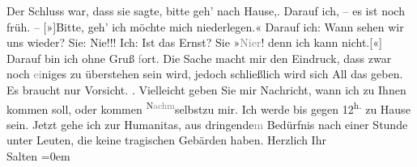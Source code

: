 \begin{ledgroupsized}[t]{13cm}
           \pstart
           Der Schluss war, dass sie
               sagte, bitte geh’ nach Hause,. Darauf ich, – es ist noch früh. –
                  {[}»{]}Bitte, geh’ ich möchte mich niederlegen.« Darauf ich: Wann
               sehen wir uns wieder? Sie:
               Nie!!! Ich: Ist das Ernst? Sie »\textcolor{gray}{Ni{\geminationm}er}! {\pb}denn ich kann
                  nicht.{[}«{]} Darauf bin ich ohne Gruß \textcolor{gray}{f}ort.\pend
           \pstart
           Die Sache macht mir den Eindruck, dass zwar noch \textcolor{gray}{ei}niges zu
               überstehen sein wird, jedoch schließlich wird sich All das geben. Es braucht nur
               Vorsicht.\pend
           \pstart
           \label{K_L03149-2v}\label{K_L03149-2h}. Vielleicht geben Sie mir Nachricht, wann ich zu Ihnen kommen soll, oder
               kommen \substVorne{}\textsuperscript{N\textcolor{gray}{achm}}\substDazwischen{}selbst\substHinten{}{ }{\pb}zu mir. Ich werde bis gegen
                     12\textsuperscript{h.}{ }zu Hause sein.\pend
           \pstart
           Jetzt gehe ich zur Humanitas, aus
                  dringende\textcolor{gray}{m} Bedürfnis nach einer Stunde unter Leuten, die keine
               tragischen Gebärden haben.\pend
           \pstart
           Herzlich Ihr {\\[\baselineskip]}\spacefill\mbox{Salten}\pend
           \leftskip=0em{}
         
         \endnumbering{}\end{ledgroupsized}  \newcommand{\dateiname}{L03149}\newcommand{\titel}{Felix Salten an Arthur Schnitzler, [26. 1. 1895]}\newcommand{\editorInnen}{Martin Anton Müller und Laura Untner}
      